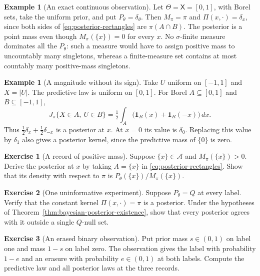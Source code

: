 \documentclass[11pt,oneside]{book}
\theoremstyle{definition}
\newtheorem{example}[theorem]{Example}
\newtheorem{exercise}{Exercise}[section]
\theoremstyle{remark}
\begin{document}
\begin{example}[An exact continuous observation]
\label{ex:bayesian-exact-continuous-record}
Let $\Theta=\mathsf X=[0,1]$, with Borel sets, take the uniform prior,
and put $P_\theta=\delta_\theta$. Then $M_\pi=\pi$ and
$\Pi(x,\cdot)=\delta_x$, since both sides of
\eqref{eq:posterior-rectangles} are $\pi(A\cap B)$. The posterior is
a point mass even though $M_\pi(\{x\})=0$ for every $x$. No
$\sigma$-finite measure dominates all the $P_\theta$: such a measure
would have to assign positive mass to uncountably many singletons,
whereas a finite-measure set contains at most countably many
positive-mass singletons.
\end{example}

\begin{example}[A magnitude without its sign]
\label{ex:bayesian-magnitude-posterior}
Take $U$ uniform on $[-1,1]$ and $X=|U|$. The predictive law is
uniform on $[0,1]$. For Borel $A\subseteq[0,1]$ and
$B\subseteq[-1,1]$,
\[
J_\pi\{X\in A,\ U\in B\}
=\tfrac12\int_A\bigl(\mathbf 1_B(x)+\mathbf 1_B(-x)\bigr)\,dx.
\]
Thus $\tfrac12\delta_x+\tfrac12\delta_{-x}$ is a posterior at $x$.
At $x=0$ its value is $\delta_0$. Replacing this value by $\delta_1$
also gives a posterior kernel, since the predictive mass of
$\{0\}$ is zero.
\end{example}

\begin{exercise}[A record of positive mass]
\label{exer:bayesian-posterior-atom}
Suppose $\{x\}\in\mathcal A$ and $M_\pi(\{x\})>0$. Derive the
posterior at $x$ by taking $A=\{x\}$ in
\eqref{eq:posterior-rectangles}. Show that its density with respect
to $\pi$ is $P_\theta(\{x\})/M_\pi(\{x\})$.
\end{exercise}

\begin{exercise}[One uninformative experiment]
\label{exer:bayesian-constant-kernel}
Suppose $P_\theta=Q$ at every label. Verify that the constant kernel
$\Pi(x,\cdot)=\pi$ is a posterior. Under the hypotheses of
Theorem~\ref{thm:bayesian-posterior-existence}, show that every
posterior agrees with it outside a single $Q$-null set.
\end{exercise}

\begin{exercise}[An erased binary observation]
\label{exer:bayesian-erased-label-posterior}
Put prior mass $s\in(0,1)$ on label one and mass $1-s$ on label zero.
The observation gives the label with probability $1-e$ and an erasure
with probability $e\in(0,1)$ at both labels. Compute the predictive law
and all posterior laws at the three records.
\end{exercise}
\end{document}
